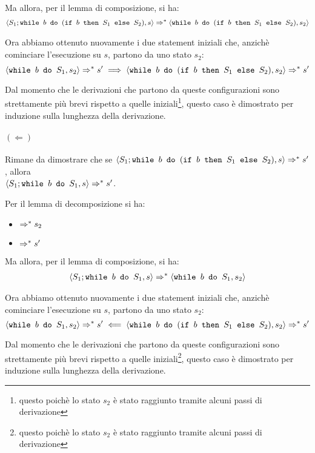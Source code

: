 Ma allora, per il lemma di composizione, si ha:
\begin{align*}
\confSs{S_1; \wbS{b}{(\ifABC{b}{S_1}{S_2})}}{s}
\Rar{*}
\confSs{\wbS{b}{(\ifABC{b}{S_1}{S_2})}}{s_2}
\end{align*}

Ora abbiamo ottenuto nuovamente i due statement iniziali che, anzichè
cominciare l'esecuzione su $s$, partono da uno stato $s_2$:
$$
\confSs{\wbS{b}{S_1}}{s_2} \Rar{*} s'
  \implies
\confSs{\wbS{b}{(\ifABC{b}{S_1}{S_2})}}{s_2} \Rar{*} s'
$$

Dal momento che le derivazioni che partono da queste configurazioni sono
strettamente più brevi rispetto a quelle iniziali\footnote{questo poichè lo
stato $s_2$ è stato raggiunto tramite alcuni passi di derivazione}, questo
caso è dimostrato per induzione sulla lunghezza della derivazione.

\paragraph{$(\Leftarrow)$}

Rimane da dimostrare che se
$\confSs{S_1; \wbS{b}{(\ifABC{b}{S_1}{S_2})}}{s} \Rar{*} s'$, allora \\
$\confSs{S_1; \wbS{b}{S_1}}{s} \Rar{*} s'$.

Per il lemma di decomposizione si ha:
\begin{itemize}
  \item {} $\Rar{*} s_2$
  \item {} $\Rar{*} s'$
\end{itemize}

Ma allora, per il lemma di composizione, si ha:
\begin{align*}
\confSs{S_1; \wbS{b}{S_1}}{s}
\Rar{*}
\confSs{\wbS{b}{S_1}}{s_2}
\end{align*}

Ora abbiamo ottenuto nuovamente i due statement iniziali che, anzichè
cominciare l'esecuzione su $s$, partono da uno stato $s_2$:
$$
\confSs{\wbS{b}{S_1}}{s_2} \Rar{*} s'
  \impliedby
\confSs{\wbS{b}{(\ifABC{b}{S_1}{S_2})}}{s_2} \Rar{*} s'
$$

Dal momento che le derivazioni che partono da queste configurazioni sono
strettamente più brevi rispetto a quelle iniziali\footnote{questo poichè lo
stato $s_2$ è stato raggiunto tramite alcuni passi di derivazione}, questo
caso è dimostrato per induzione sulla lunghezza della derivazione.

\cvd


